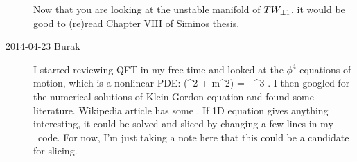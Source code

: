 \begin{description}
Now that you are looking at the unstable manifold of $TW_{\pm1}$, it
would be good to (re)read Chapter VIII of Siminos thesis.

\item[2014-04-23 Burak] I started reviewing QFT in my free time and looked
at the $\phi^4$ equations of motion, which is a nonlinear PDE:
\beq
	(\partial^2 + m^2) \phi = -  \phi^3 .
\eeq
I then googled for the numerical solutions of Klein-Gordon equation and
found some literature. Wikipedia article has some
. If 1D equation gives anything interesting, it
could be solved and sliced by changing a few lines in my \KS\ code. For now,
I'm just taking a note here that this could be a candidate for slicing.
\end{description}



\renewcommand{\ssp}{a}
